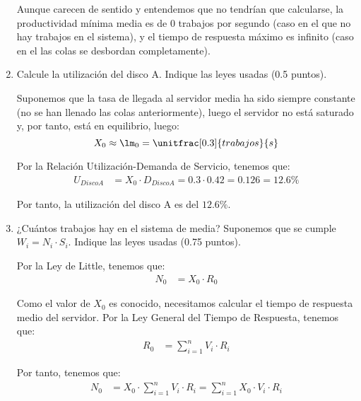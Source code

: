 \documentclass[12pt]{article}
\begin{document}
\begin{ejercicio}[2 puntos]
\begin{enumerate}
            Aunque carecen de sentido y entendemos que no tendrían que calcularse, la productividad mínima media es de $0$ trabajos por segundo (caso en el que no hay trabajos en el sistema), y el tiempo de respuesta máximo es infinito (caso en el las colas se desbordan completamente).
            \item Calcule la utilización del disco A. Indique las leyes usadas (0.5 puntos).
            
            Suponemos que la tasa de llegada al servidor media ha sido siempre constante (no se han llenado las colas anteriormente), luego el servidor no está saturado y, por tanto, está en equilibrio, luego:
            \begin{equation*}
                X_0 \approx \lm_0 = \unitfrac[0.3]{trabajos}{s}
            \end{equation*}

            Por la Relación Utilización-Demanda de Servicio, tenemos que:
            \begin{align*}
                U_{Disco A} &= X_0\cdot D_{Disco A} = 0.3\cdot 0.42 = 0.126 = 12.6\%
            \end{align*}

            Por tanto, la utilización del disco A es del $12.6\%$.
            
            
            \item ¿Cuántos trabajos hay en el sistema de media? Suponemos que se cumple $W_i = N_i\cdot S_i$. Indique las leyes usadas (0.75 puntos).
            
            Por la Ley de Little, tenemos que:
            \begin{align*}
                N_0 &= X_0\cdot R_0
            \end{align*}

            Como el valor de $X_0$ es conocido, necesitamos calcular el tiempo de respuesta medio del servidor. Por la Ley General del Tiempo de Respuesta, tenemos que:
            \begin{align*}
                R_0 &= \sum_{i=1}^{n} V_i\cdot R_i
            \end{align*}


            Por tanto, tenemos que:
            \begin{align*}
                N_0 &= X_0\cdot \sum_{i=1}^{n} V_i\cdot R_i
                = \sum_{i=1}^{n} X_0\cdot V_i\cdot R_i
            \end{align*}


\end{enumerate}
\end{ejercicio}
\end{document}
